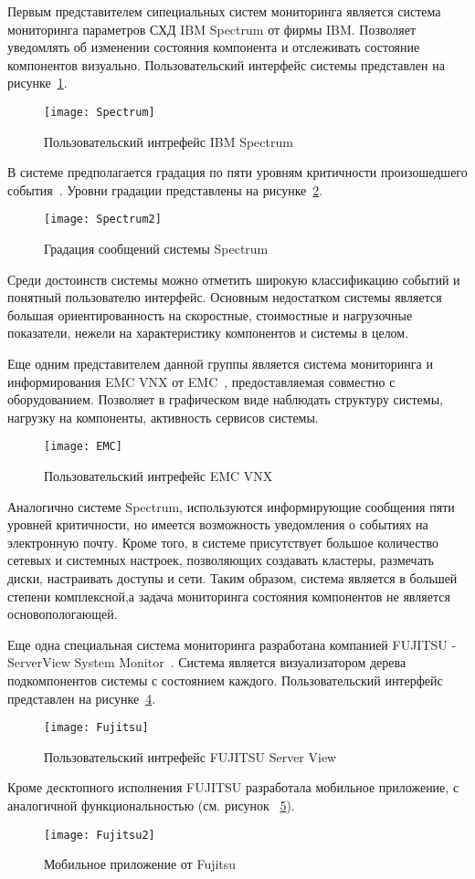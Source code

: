 Первым представителем сипециальных систем мониторинга является система мониторинга параметров СХД IBM Spectrum от фирмы IBM. Позволяет уведомлять об изменении состояния компонента и отслеживать состояние компонентов визуально. Пользовательский интерфейс системы представлен на рисунке~\ref{fig:Spectrum}.
\begin{figure}[!h]
	\centering
	\texttt{[image: Spectrum]}
	\caption{Пользовательский интрефейс IBM Spectrum}
	\label{fig:Spectrum}
\end{figure}

В системе предполагается градация по пяти уровням критичности произошедшего события~\cite{Spectrum}. Уровни градации представлены на рисунке~\ref{fig:Spectrum2}.
\begin{figure}[!h]
	\centering
	\texttt{[image: Spectrum2]}
	\caption{Градация сообщений системы Spectrum}
	\label{fig:Spectrum2}
\end{figure}
Среди достоинств системы можно отметить широкую классификацию событий и понятный пользователю интерфейс. Основным недостатком системы является большая ориентированность на скоростные, стоимостные и нагрузочные показатели, нежели на характеристику компонентов и системы в целом. 

Еще одним представителем данной группы является система мониторинга и информирования EMC VNX от EMC~\cite{EMC}, предоставляемая совместно с оборудованием. Позволяет в графическом виде наблюдать структуру системы, нагрузку на компоненты, активность сервисов системы. 
\begin{figure}[!h]
	\centering
	\texttt{[image: EMC]}
	\caption{Пользовательский интрефейс EMC VNX}
	\label{fig:EMC}
\end{figure}
Аналогично системе Spectrum, используются информирующие сообщения пяти уровней критичности, но имеется возможность уведомления о событиях на электронную почту. Кроме того, в системе присутствует большое количество сетевых и системных настроек, позволяющих создавать кластеры, размечать диски, настраивать доступы и сети. Таким образом, система является в большей степени комплексной,а задача мониторинга состояния компонентов не является основопологающей. 

Еще одна специальная система мониторинга разработана компанией FUJITSU - ServerView System Monitor~\cite{Fujitsu}. Система является визуализатором дерева подкомпонентов системы с состоянием каждого. Пользовательский интерфейс представлен на рисунке~\ref{fig:Fujitsu}.  
\begin{figure}[!h]
	\centering
	\texttt{[image: Fujitsu]}
	\caption{Пользовательский интрефейс FUJITSU Server View}
	\label{fig:Fujitsu}
\end{figure}
Кроме десктопного исполнения FUJITSU разработала мобильное приложение, с аналогичной функциональностью (см. рисунок ~\ref{fig:Fujitsu2}).
\begin{figure}[!h]
	\centering
	\texttt{[image: Fujitsu2]}
	\caption{Мобильное приложение от Fujitsu}
	\label{fig:Fujitsu2}
\end{figure}

